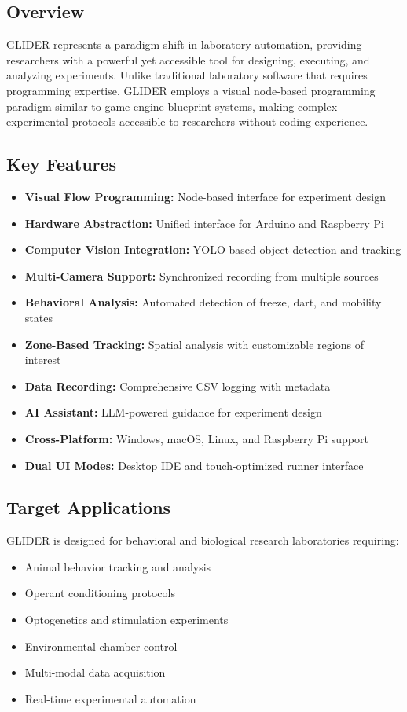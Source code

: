 \documentclass[11pt,a4paper]{article}
\begin{document}
\subsection{Overview}

GLIDER represents a paradigm shift in laboratory automation, providing researchers with a powerful yet accessible tool for designing, executing, and analyzing experiments. Unlike traditional laboratory software that requires programming expertise, GLIDER employs a visual node-based programming paradigm similar to game engine blueprint systems, making complex experimental protocols accessible to researchers without coding experience.

\subsection{Key Features}

\begin{itemize}    \item \textbf{Visual Flow Programming:} Node-based interface for experiment design
    \item \textbf{Hardware Abstraction:} Unified interface for Arduino and Raspberry Pi
    \item \textbf{Computer Vision Integration:} YOLO-based object detection and tracking
    \item \textbf{Multi-Camera Support:} Synchronized recording from multiple sources
    \item \textbf{Behavioral Analysis:} Automated detection of freeze, dart, and mobility states
    \item \textbf{Zone-Based Tracking:} Spatial analysis with customizable regions of interest
    \item \textbf{Data Recording:} Comprehensive CSV logging with metadata
    \item \textbf{AI Assistant:} LLM-powered guidance for experiment design
    \item \textbf{Cross-Platform:} Windows, macOS, Linux, and Raspberry Pi support
    \item \textbf{Dual UI Modes:} Desktop IDE and touch-optimized runner interface
\end{itemize}

\subsection{Target Applications}

GLIDER is designed for behavioral and biological research laboratories requiring:
\begin{itemize}    \item Animal behavior tracking and analysis
    \item Operant conditioning protocols
    \item Optogenetics and stimulation experiments
    \item Environmental chamber control
    \item Multi-modal data acquisition
    \item Real-time experimental automation
\end{itemize}
\end{document}
